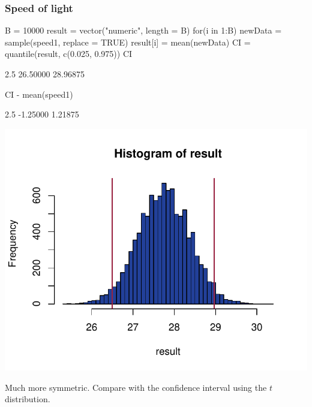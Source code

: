 \documentclass[a4paper]{article}\usepackage[]{graphicx}\usepackage[]{xcolor}
\makeatletter
\def\maxwidth{ %
  \ifdim\Gin@nat@width>\linewidth
    \linewidth
  \else
    \Gin@nat@width
  \fi
}
\makeatother
\begin{document}
\subsubsection{Speed of light}
\begin{Schunk}
\begin{Sinput}
B = 10000
result = vector("numeric", length = B)
for(i in 1:B){
  newData = sample(speed1, replace = TRUE)
  result[i] = mean(newData)
}
CI = quantile(result, c(0.025, 0.975))
CI
\end{Sinput}
\begin{Soutput}
    2.5%
26.50000 28.96875 
\end{Soutput}
\begin{Sinput}
CI - mean(speed1)
\end{Sinput}
\begin{Soutput}
    2.5%
-1.25000  1.21875 
\end{Soutput}


{\centering \includegraphics[width=\maxwidth]{figure/listings-unnamed-chunk-172-1} 

}

\end{Schunk}
Much more symmetric.
Compare with the confidence interval using the \( t \) distribution.
\end{document}
